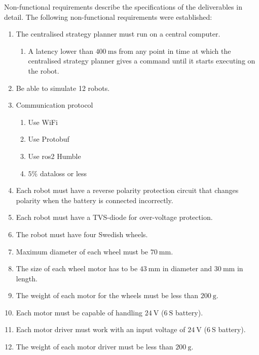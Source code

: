 Non-functional requirements describe the specifications of the deliverables in detail. The following non-functional requirements were established:
\begin{enumerate}[label*=\arabic*.]
    \item The centralised strategy planner must run on a central computer.
    \begin{enumerate}[label*=\arabic*.]
        \item A latency lower than $400\:\text{ms}$ from any point in time at which the centralised strategy planner gives a command until it starts executing on the robot.
    \end{enumerate}
    \item Be able to simulate 12 robots.
    \item Communication protocol
    \begin{enumerate}[label*=\arabic*.]
        \item Use WiFi
        \item Use Protobuf
        \item Use \ac{ros2} Humble
        \item $5\%$ dataloss or less
    \end{enumerate}
    \item Each robot must have a reverse polarity protection circuit that changes polarity when the battery is connected incorrectly.
    \item Each robot must have a TVS-diode for over-voltage protection.
    \item The robot must have four Swedish wheels.
    \item Maximum diameter of each wheel must be $70\:\text{mm}$.
    \item The size of each wheel motor has to be $43\:\text{mm}$ in diameter and $30\:\text{mm}$ in length.
    \item The weight of each motor for the wheels must be less than $200\:\text{g}$.
    \item Each motor must be capable of handling $24\:\text{V}$ ($6\:\text{S}$ battery).
    \item Each motor driver must work with an input voltage of $24\:\text{V}$ ($6\:\text{S}$ battery).
    \item The weight of each motor driver must be less than $200\:\text{g}$.

\end{enumerate}
